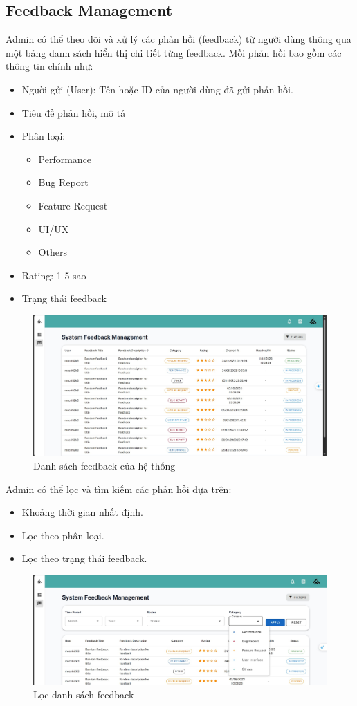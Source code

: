 \subsection{Feedback Management}
Admin có thể theo dõi và xử lý các phản hồi (feedback) từ người dùng thông qua một bảng danh sách hiển thị chi tiết từng feedback. Mỗi phản hồi bao gồm các thông tin chính như:
\begin{itemize}
    \item Người gửi (User): Tên hoặc ID của người dùng đã gửi phản hồi.
    \item Tiêu đề phản hồi, mô tả
    \item Phân loại:
    \begin{itemize}
        \item Performance
        \item Bug Report
        \item Feature Request
        \item UI/UX
        \item Others
    \end{itemize}
    \item Rating: 1-5 sao
    \item Trạng thái feedback
\end{itemize}

\begin{figure}[H]
        \centering
        \includegraphics[width=0.8\linewidth]{images/feedback_management.png}
        \caption{Danh sách feedback của hệ thống}
        \label{fig:enter-label}
    \end{figure}
Admin có thể lọc và tìm kiếm các phản hồi dựa trên:
\begin{itemize}
    \item Khoảng thời gian nhất định.
    \item Lọc theo phân loại.
    \item Lọc theo trạng thái feedback.
\end{itemize}
\begin{figure}[H]
        \centering
        \includegraphics[width=0.8\linewidth]{images/feedback_filter.png}
        \caption{Lọc danh sách feedback}
        \label{fig:enter-label}
    \end{figure}